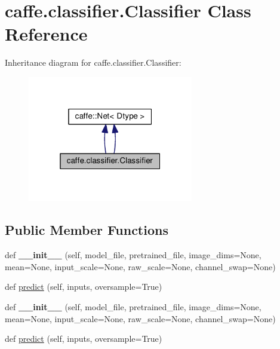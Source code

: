 \hypertarget{classcaffe_1_1classifier_1_1_classifier}{}\section{caffe.\+classifier.\+Classifier Class Reference}
\label{classcaffe_1_1classifier_1_1_classifier}


Inheritance diagram for caffe.\+classifier.\+Classifier\+:
\nopagebreak
\begin{figure}[H]
\begin{center}
\leavevmode
\includegraphics[width=205pt]{classcaffe_1_1classifier_1_1_classifier__inherit__graph}
\end{center}
\end{figure}
\subsection*{Public Member Functions}
\begin{DoxyCompactItemize}
\item 
\mbox{\label{classcaffe_1_1classifier_1_1_classifier_afba50ceb2062164b5bb1f88fa6ede7c6}} 
def {\bfseries \+\_\+\+\_\+init\+\_\+\+\_\+} (self, model\+\_\+file, pretrained\+\_\+file, image\+\_\+dims=None, mean=None, input\+\_\+scale=None, raw\+\_\+scale=None, channel\+\_\+swap=None)
\item 
def \mbox{\hyperlink{classcaffe_1_1classifier_1_1_classifier_a8d1d898b351cc84cd9f12ce10401312d}{predict}} (self, inputs, oversample=True)
\item 
\mbox{\label{classcaffe_1_1classifier_1_1_classifier_afba50ceb2062164b5bb1f88fa6ede7c6}} 
def {\bfseries \+\_\+\+\_\+init\+\_\+\+\_\+} (self, model\+\_\+file, pretrained\+\_\+file, image\+\_\+dims=None, mean=None, input\+\_\+scale=None, raw\+\_\+scale=None, channel\+\_\+swap=None)
\item 
def \mbox{\hyperlink{classcaffe_1_1classifier_1_1_classifier_a8d1d898b351cc84cd9f12ce10401312d}{predict}} (self, inputs, oversample=True)
\end{DoxyCompactItemize}
